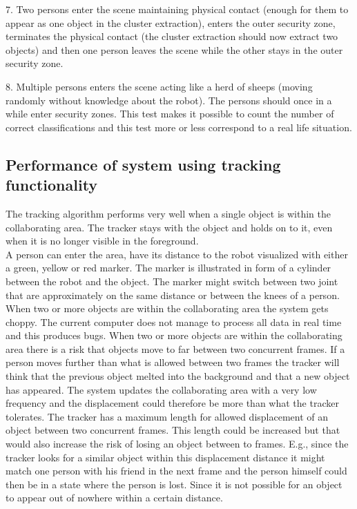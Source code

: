 7. Two persons enter the scene maintaining physical contact (enough for them to appear as one object in the cluster extraction), enters the outer security zone, terminates the physical contact (the cluster extraction should now extract two objects) and then one person leaves the scene while the other stays in the outer security zone.


8. Multiple persons enters the scene acting like a herd of sheeps (moving randomly without knowledge about the robot). The persons should once in a while enter security zones. This test makes it possible to count the number of correct classifications and this test more or less correspond to a real life situation. 

\subsection{Performance of system using tracking functionality}
The tracking algorithm performs very well when a single object is within the collaborating area.
The tracker stays with the object and holds on to it, even when it is no longer visible in the foreground.\\

A person can enter the area, have its distance to the robot visualized with either a green, yellow or red marker.
The marker is illustrated in form of a cylinder between the robot and the object.
The marker might switch between two joint that are approximately on the same distance or between the knees of a person.\\

When two or more objects are within the collaborating area the system gets choppy.
The current computer does not manage to process all data in real time and this produces bugs.
When two or more objects are within the collaborating area there is a risk that objects move to far between two concurrent frames.
If a person moves further than what is allowed between two frames the tracker will think that the previous object melted into the background and that a new object has appeared.
The system updates the collaborating area with a very low frequency and the displacement could therefore be more than what the tracker tolerates.
The tracker has a maximum length for allowed displacement of an object between two concurrent frames.
This length could be increased but that would also increase the risk of losing an object between to frames.
E.g., since the tracker looks for a similar object within this displacement distance it might match one person with his friend in the next frame and the person himself could then be in a state where the person is lost. 
Since it is not possible for an object to appear out of nowhere within a certain distance.



